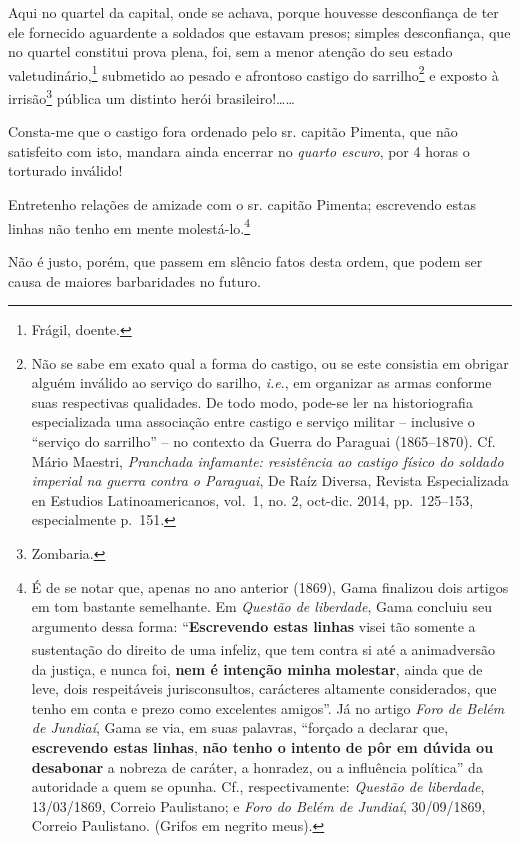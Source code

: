 Aqui no quartel da capital, onde se achava, porque houvesse desconfiança
de ter ele fornecido aguardente a soldados que estavam presos; simples
desconfiança, que no quartel constitui prova plena, foi, sem a menor
atenção do seu estado valetudinário,\footnote{ Frágil, doente.}
submetido ao pesado e afrontoso castigo do sarrilho\footnote{ Não se
  sabe em exato qual a forma do castigo, ou se este consistia em obrigar
  alguém inválido ao serviço do sarilho, \emph{i.e}., em organizar as
  armas conforme suas respectivas qualidades. De todo modo, pode-se ler
  na historiografia especializada uma associação entre castigo e serviço
  militar -- inclusive o ``serviço do sarrilho'' -- no contexto da
  Guerra do Paraguai (1865--1870). Cf. Mário Maestri, \emph{Pranchada
  infamante: resistência ao castigo físico do soldado imperial na guerra
  contra o Paraguai}, De Raíz Diversa, Revista Especializada en Estudios
  Latinoamericanos, vol.~1, no. 2, oct-dic. 2014, pp.~125--153,
  especialmente p.~151.} e exposto à irrisão\footnote{ Zombaria.}
pública um distinto herói brasileiro!\ldots\ldots{}

Consta-me que o castigo fora ordenado pelo sr. capitão Pimenta, que não
satisfeito com isto, mandara ainda encerrar no \emph{quarto escuro}, por
4 horas o torturado inválido!

Entretenho relações de amizade com o sr. capitão Pimenta; escrevendo
estas linhas não tenho em mente molestá-lo.\footnote{ É de se notar
  que, apenas no ano anterior (1869), Gama finalizou dois artigos em tom
  bastante semelhante. Em \emph{Questão de liberdade}, Gama concluiu seu
  argumento dessa forma: ``\textbf{Escrevendo estas linhas} visei tão
  somente a sustentação do direito de uma infeliz, que tem contra si até
  a animadversão\textsuperscript{⁠} da justiça, e nunca foi, \textbf{nem
  é intenção minha} \textbf{molestar}, ainda que de leve, dois
  respeitáveis jurisconsultos, carácteres altamente considerados, que
  tenho em conta e prezo como excelentes amigos''. Já no artigo
  \emph{Foro de Belém de Jundiaí}, Gama se via, em suas palavras,
  ``forçado a declarar que, \textbf{escrevendo estas linhas},
  \textbf{não tenho o intento de pôr em dúvida ou desabonar} a nobreza
  de caráter, a honradez, ou a influência política'' da autoridade a
  quem se opunha. Cf., respectivamente: \emph{Questão de liberdade},
  13/03/1869, Correio Paulistano; e \emph{Foro do Belém de Jundiaí},
  30/09/1869, Correio Paulistano. (Grifos em negrito meus).}

Não é justo, porém, que passem em slêncio fatos desta ordem, que podem
ser causa de maiores barbaridades no futuro.

